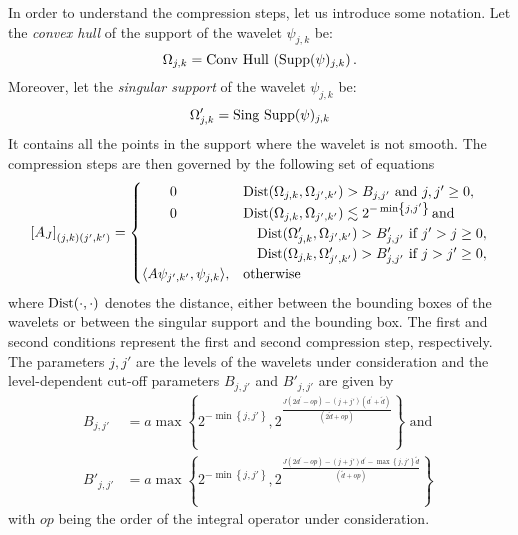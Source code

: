 In order to understand the compression steps, let us introduce some
notation. Let the \emph{convex hull} of the support of the wavelet $\psi_{j,k}$
be:
\begin{equation}
  \Omega_{j,k} = \mathop{}\!\mathrm{Conv}\,\mathop{}\!\mathrm{Hull}\,\left(\mathop{}\!\mathrm{Supp}(\psi)_{j,k}\right).
\end{equation}
Moreover, let the \emph{singular support} of the wavelet $\psi_{j,k}$ be:
\begin{equation}
  \Omega'_{j,k} = \mathop{}\!\mathrm{Sing}\,\mathop{}\!\mathrm{Supp}(\psi)_{j,k}
\end{equation}
It contains all the points in the support where the wavelet is not smooth.
The compression steps are then governed by the following set of
equations
\begin{equation}
  \left[A_J\right]_{\left(j,k\right)\left(j',k'\right)} =
  \begin{cases}
    \quad\quad 0 & \mathop{}\!\mathrm{Dist}(\Omega_{j,k}, \Omega_{j',k'}) > B_{j,j'} \text{ and }j,j' \geq 0, \\
    \quad\quad 0 & \mathop{}\!\mathrm{Dist}(\Omega_{j,k}, \Omega_{j',k'}) \lesssim 2^{-\min\left\{j,j'\right\}} \,\text{and} \\
      & \quad \mathop{}\!\mathrm{Dist}(\Omega'_{j,k}, \Omega_{j',k'}) > B'_{j,j'} \text{ if }j' > j \geq 0, \\
      & \quad \mathop{}\!\mathrm{Dist}(\Omega_{j,k}, \Omega'_{j',k'}) > B'_{j,j'} \text{ if }j > j' \geq 0, \\
    \langle A\psi_{j',k'},\psi_{j,k}\rangle, & \text{otherwise}
  \end{cases}
\label{eq:compression}
\end{equation}
where $\mathop{}\!\mathrm{Dist}(\cdot, \cdot)$ denotes the distance, either between
the bounding boxes of the wavelets or between the singular support and the
bounding box. The first and second conditions represent the first and second
compression step, respectively. The parameters $j,j'$ are the
levels of the wavelets under consideration and the
level-dependent cut-off parameters $B_{j,j'}$ and $B'_{j,j'}$ are given
by
\begin{align*}
  B_{j,j'} &= a \max
  \left\{2^{-\min\left\{j,j'\right\}},
  2^{\frac{J\left(2d^\prime-op\right) -
  \left(j+j'\right)\left(d^\prime+\tilde{d}\right)}{\left(2\tilde{d}+op\right)}}\right\}
  \text{ and }\\ B'_{j,j'} &= a \max
  \left\{2^{-\min\left\{j,j'\right\}},
  2^{\frac{J\left(2d^\prime-op\right) -
\left(j+j'\right)d^\prime-\max\left\{j,j'\right\}\tilde{d}}{\left(\tilde{d}+op\right)}}\right\}
\end{align*}
with $op$ being the order of the integral operator under consideration.
